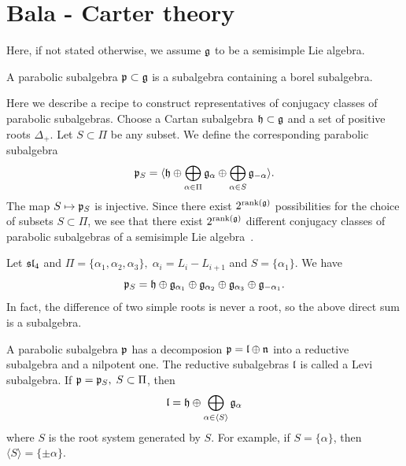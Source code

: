 \section{Bala - Carter theory}
Here, if not stated otherwise, we assume $\mathfrak{g}$ to be a semisimple Lie algebra.
\begin{dang}
    \begin{definition}
        A parabolic subalgebra $\mathfrak{p}\subset \mathfrak{g}$ is a subalgebra containing a borel subalgebra. 
    \end{definition}
\end{dang}
Here we describe a recipe to construct representatives of conjugacy classes of parabolic subalgebras. Choose 
a Cartan subalgebra $\mathfrak{h}\subset\mathfrak{g}$ and a set of positive roots $\Delta_+$. Let $S\subset\Pi$ be any subset. 
We define the corresponding parabolic subalgebra
\begin{equation}
    \mathfrak{p}_S = \langle \mathfrak{h}\oplus\bigoplus_{\alpha\in\Pi}\mathfrak{g}_\alpha\oplus\bigoplus_{\alpha\in S}\mathfrak{g}_{-\alpha}\rangle.
\end{equation}
The map $S\mapsto\mathfrak{p}_S$ is injective. 
Since there exist $2^{\text{rank}(\mathfrak{g})}$ possibilities for the choice of subsets $S\subset \Pi$, we see that 
there exist $2^{\text{rank}(\mathfrak{g})}$ different conjugacy classes of parabolic subalgebras of a semisimple Lie algebra~\cite{collingwood2017nilpotent}.
\begin{example}
    Let $\mathfrak{sl}_4$ and $\Pi=\{\alpha_1,\alpha_2,\alpha_3\},\;\alpha_i= L_i - L_{i+1}$ and $S=\{\alpha_1\}$. We have 
    \begin{equation}
        \mathfrak{p}_S = \mathfrak{h}\oplus\mathfrak{g}_{\alpha_1}\oplus\mathfrak{g}_{\alpha_2}\oplus\mathfrak{g}_{\alpha_3}\oplus\mathfrak{g}_{-\alpha_1}.
    \end{equation}
    In fact, the difference of two simple roots is never a root, so the above direct sum is a subalgebra.
\end{example}



\begin{dang}
    \begin{lemma}
        A parabolic subalgebra $\mathfrak{p}$ has a decomposion $\mathfrak{p}=\mathfrak{l}\oplus\mathfrak{n}$ into a reductive  
        subalgebra and a nilpotent one. The reductive subalgebras $\mathfrak{l}$ is called a Levi subalgebra. 
        If $\mathfrak{p} = \mathfrak{p}_S,\; S\subset\Pi$, then 
        \begin{equation}
            \mathfrak{l}=\mathfrak{h}\oplus \bigoplus_{\alpha\in\langle S\rangle}\mathfrak{g}_{\alpha}
        \end{equation}  
        where $S$ is the root system generated by $S$. For example, if $S=\{\alpha\}$, then 
        $\langle S\rangle = \{\pm\alpha\}$.
    \end{lemma}
\end{dang}



